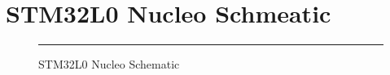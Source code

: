 
\chapter{STM32L0 Nucleo Schmeatic}

\label{stm32}


\begin{figure}[htbp]
  \centering
  \rule{35em}{0.5pt}
  \caption[STM32L0 Nucleo Schmeatic]{STM32L0 Nucleo Schematic}
  \label{fig:mcupin}
\end{figure}
